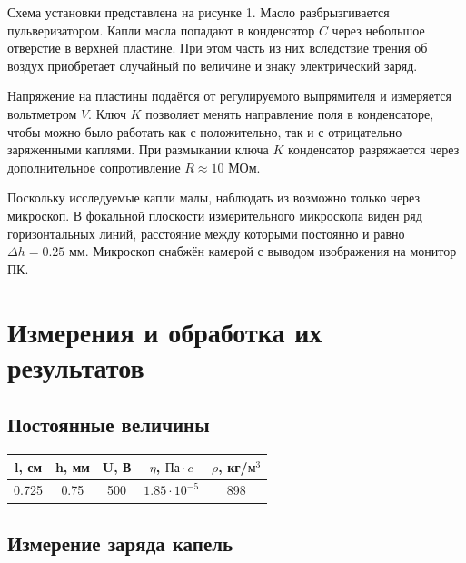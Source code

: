 \documentclass[14pt, a4paper,reqno]{article}
\begin{document}
    Схема установки представлена на рисунке 1. Масло разбрызгивается пульверизатором. Капли масла попадают
    в конденсатор $C$ через небольшое отверстие в верхней пластине. При этом часть из них вследствие
    трения об воздух приобретает случайный по величине и знаку электрический заряд.
    
    Напряжение на пластины подаётся от регулируемого выпрямителя и измеряется вольтметром $V$. Ключ
    $K$ позволяет менять направление поля в конденсаторе, чтобы можно было работать как с положительно,
    так и с отрицательно заряженными каплями. При размыкании ключа $K$ конденсатор разряжается через
    дополнительное сопротивление $R \approx 10$ МОм.

    Поскольку исследуемые капли малы, наблюдать из возможно только через микроскоп. В фокальной плоскости
    измерительного микроскопа виден ряд горизонтальных линий, расстояние между которыми постоянно и
    равно $\Delta h = 0.25$ мм. Микроскоп снабжён камерой с выводом изображения на монитор ПК.

\section{Измерения и обработка их результатов}

    \subsection{Постоянные величины}

        \begin{center}
            \begin{tabular}{|c|c|c|c|c|}
                \hline
                l, см & h, мм & U, В & $\eta$, $Па \cdot c$ & $\rho$, кг/$м^3$ \\ \hline
                0.725 &  0.75 &  500 & $1.85 \cdot 10^{-5}$ &              898 \\ \hline
            \end{tabular}
        \end{center}

        \subsection{Измерение заряда капель}
\end{document}
